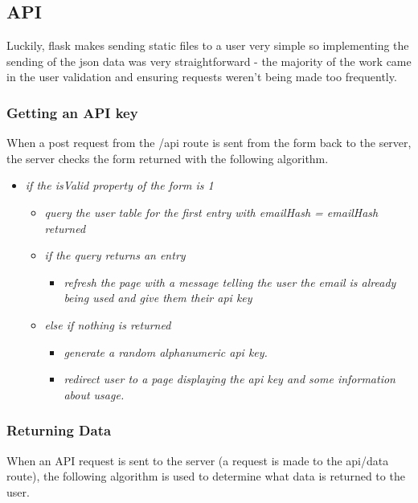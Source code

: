         \subsection{API}

        Luckily, flask makes sending static files to a user very simple so implementing the sending of the json data was very straightforward - the majority of the work came in the user validation and ensuring requests weren't being made too frequently.

        \subsubsection{Getting an API key}
            When a post request from the /api route is sent from the form back to the server, the server checks the form returned with the following algorithm.

            \vspace{3mm}\linebreak
            \begin{itemize}
                \item \textit{if the isValid property of the form is 1}
                \begin{itemize}
                    \item \textit{query the user table for the first entry with emailHash = emailHash returned}
                    \item \textit{if the query returns an entry}
                    \begin{itemize}
                        \item \textit{refresh the page with a message telling the user the email is already being used and give them their api key}
                    \end{itemize}
                    \item \textit{else if nothing is returned}
                    \begin{itemize}
                        \item \textit{generate a random alphanumeric api key.}
                        \item \textit{redirect user to a page displaying the api key and some information about usage.}
                    \end{itemize}
                \end{itemize}
            \end{itemize}

        \subsubsection{Returning Data}
            When an API request is sent to the server (a request is made to the api/data route), the following algorithm is used to determine what data is returned to the user.


